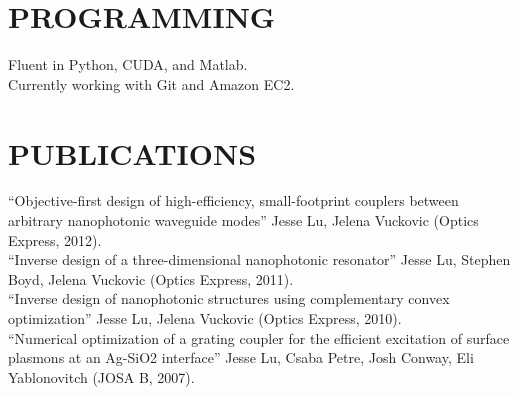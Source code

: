 \documentclass{res}
\begin{document}
\begin{resume}
\section{PROGRAMMING}          
    Fluent in Python, CUDA, and Matlab. \\
    Currently working with Git and Amazon EC2.


\section{PUBLICATIONS}          
    ``Objective-first design of high-efficiency, small-footprint couplers between arbitrary nanophotonic waveguide modes'' Jesse Lu, Jelena Vuckovic (Optics Express, 2012). \\
    ``Inverse design of a three-dimensional nanophotonic resonator'' Jesse Lu, Stephen Boyd, Jelena Vuckovic (Optics Express, 2011). \\
    ``Inverse design of nanophotonic structures using complementary convex optimization'' Jesse Lu, Jelena Vuckovic (Optics Express, 2010). \\
    ``Numerical optimization of a grating coupler for the efficient excitation of surface plasmons at an Ag-SiO2 interface'' Jesse Lu, Csaba Petre, Josh Conway, Eli Yablonovitch (JOSA B, 2007).
 
\end{resume}
\end{document}
